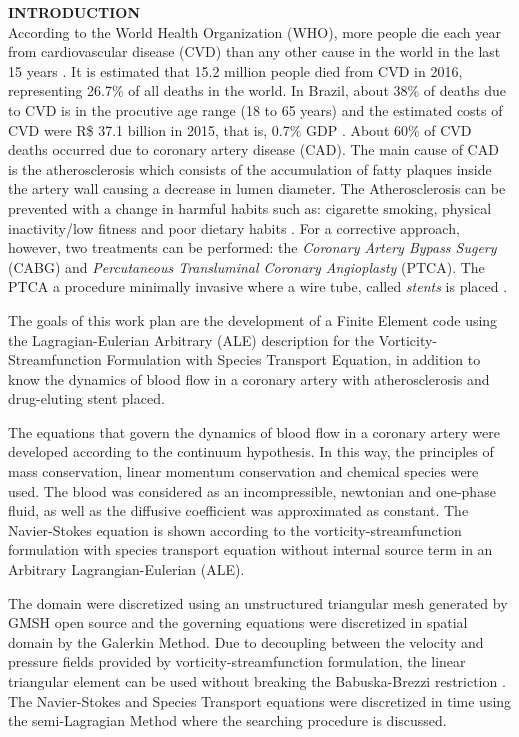 \noindent\textbf{INTRODUCTION}
\\

According to the World Health Organization (WHO), more people die each year from cardiovascular disease (CVD) than any other cause in the world in the last 15 years \cite{oms2018}.
It is estimated that 15.2 million people died from CVD in 2016,
representing 26.7\% of all deaths in the world. 
In Brazil, about 38\% of deaths due to CVD is in the procutive age range
(18 to 65 years) and the estimated
costs of CVD were R\$ 37.1 billion
in 2015, that is, 0.7\% GDP \cite{siqueira2017}.
About 60\% of CVD deaths
occurred due to coronary artery disease (CAD).
The main cause of CAD is the atherosclerosis which consists of
the accumulation of fatty plaques inside the artery wall causing
a decrease in lumen diameter.
The Atherosclerosis can be prevented with a change in harmful habits
such as: cigarette smoking, physical inactivity/low fitness and poor dietary habits \cite{spring2013}.
For a corrective approach, however, two treatments can be performed:
the \textit{Coronary Artery Bypass Sugery} (CABG) and
\textit{Percutaneous Transluminal Coronary Angioplasty} (PTCA).
The PTCA a procedure minimally invasive where a wire tube,
called \textit{stents} is placed \cite{sigwart1987}.

\medskip
The goals of this work plan are the development of a
Finite Element code using the Lagragian-Eulerian Arbitrary (ALE) 
description for the Vorticity-Streamfunction Formulation 
with Species Transport Equation, 
in addition to know the dynamics of blood flow in a 
coronary artery with atherosclerosis and drug-eluting stent placed.

\medskip
The equations that govern the dynamics of blood flow in a coronary artery were developed according to the continuum hypothesis.
In this way, the principles of mass conservation, linear momentum conservation and chemical species were used.
The blood was considered as an incompressible, newtonian and one-phase 
fluid, as well as the diffusive coefficient was approximated as constant.
The Navier-Stokes equation is shown according to the 
vorticity-streamfunction formulation with species transport 
equation without internal source term in an 
Arbitrary Lagrangian-Eulerian (ALE).

\medskip
The domain were discretized using an unstructured triangular 
mesh generated by GMSH open source \cite{gmsh} and 
the governing equations were discretized in spatial domain 
by the Galerkin Method. 
Due to decoupling between the velocity and pressure fields 
provided by vorticity-streamfunction formulation, the linear 
triangular element can be used without breaking the 
Babuska-Brezzi restriction \cite{babuska1971}\cite{brezzi1974}.
The Navier-Stokes and Species Transport equations were 
discretized in time using the semi-Lagragian Method 
\cite{pironneau1982} where the searching procedure is
discussed.

